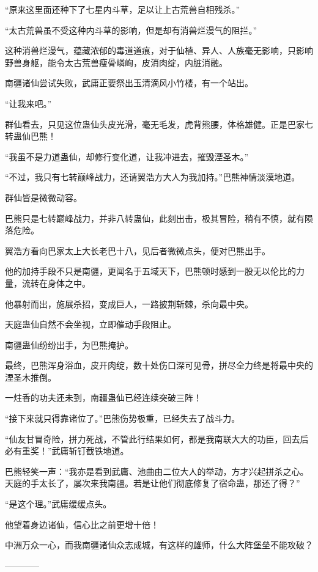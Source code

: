 \begin{this_body}
“原来这里面还种下了七星内斗草，足以让上古荒兽自相残杀。”

“太古荒兽虽不受这种内斗草的影响，但是却有消兽烂漫气的阻拦。”

这种消兽烂漫气，蕴藏浓郁的毒道道痕，对于仙植、异人、人族毫无影响，只影响野兽身躯，能令太古荒兽瘦骨嶙峋，皮消肉绽，内脏消融。

南疆诸仙尝试失败，武庸正要祭出玉清滴风小竹楼，有一个站出。

“让我来吧。”

群仙看去，只见这位蛊仙头皮光滑，毫无毛发，虎背熊腰，体格雄健。正是巴家七转蛊仙巴熊！

“我虽不是力道蛊仙，却修行变化道，让我冲进去，摧毁湮圣木。”

“不过，我只有七转巅峰战力，还请翼浩方大人为我加持。”巴熊神情淡漠地道。

群仙皆是微微动容。

巴熊只是七转巅峰战力，并非八转蛊仙，此刻出击，极其冒险，稍有不慎，就有陨落危险。

翼浩方看向巴家太上大长老巴十八，见后者微微点头，便对巴熊出手。

他的加持手段不只是南疆，更闻名于五域天下，巴熊顿时感到一股无以伦比的力量，流转在身体之中。

他暴射而出，施展杀招，变成巨人，一路披荆斩棘，杀向最中央。

天庭蛊仙自然不会坐视，立即催动手段阻止。

南疆蛊仙纷纷出手，为巴熊掩护。

最终，巴熊浑身浴血，皮开肉绽，数十处伤口深可见骨，拼尽全力终是将最中央的湮圣木推倒。

一炷香的功夫还未到，南疆蛊仙已经连续突破三阵！

“接下来就只得靠诸位了。”巴熊伤势极重，已经失去了战斗力。

“仙友甘冒奇险，拼力死战，不管此行结果如何，都是我南联大大的功臣，回去后必有重奖！”武庸斩钉截铁地道。

巴熊轻笑一声：“我亦是看到武庸、池曲由二位大人的举动，方才兴起拼杀之心。天庭的手太长了，屡次来我南疆。若是让他们彻底修复了宿命蛊，那还了得？”

“是这个理。”武庸缓缓点头。

他望着身边诸仙，信心比之前更增十倍！

中洲万众一心，而我南疆诸仙众志成城，有这样的雄师，什么大阵堡垒不能攻破？

------------

\end{this_body}

